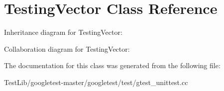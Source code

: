 \hypertarget{classTestingVector}{}\section{Testing\+Vector Class Reference}
\label{classTestingVector}


Inheritance diagram for Testing\+Vector\+:


Collaboration diagram for Testing\+Vector\+:


The documentation for this class was generated from the following file\+:\begin{DoxyCompactItemize}
\item 
Test\+Lib/googletest-\/master/googletest/test/gtest\+\_\+unittest.\+cc\end{DoxyCompactItemize}
